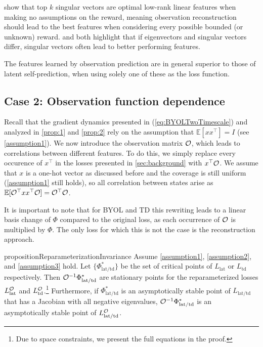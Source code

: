 \textcite{behzadian2019fast} show that top $k$ singular vectors are optimal low-rank linear features when making no assumptions on the reward, meaning observation reconstruction should lead to the best features when considering every possible bounded (or unknown) reward.
\textcite{behzadian2019fast} and \textcite{lelan2023bootstrapped} both highlight that if eigenvectors and singular vectors differ, singular vectors often lead to better performing features.

\begin{tcolorbox}[boxrule=0.2mm,colback=white,colframe=uoftblue,boxsep=0pt,top=3pt,bottom=5pt]
\begin{insight} The features learned by observation prediction are in general superior to those of latent self-prediction, when using solely one of these as the loss function.
\label{insight1}
\end{insight}
\end{tcolorbox}

\subsection{Case 2: Observation function dependence}
\label{sec:observation}

Recall that the gradient dynamics presented in (\ref{eq:BYOLTwoTimescale}) and analyzed in \autoref{prop:1} and \autoref{prop:2} rely on the assumption that $\mathbb{E}[xx^\top] = I$ (see \autoref{assumption1}).
We now introduce the observation matrix ${\mathcal{O}}$, which leads to correlations between different features.
To do this, we simply replace every occurence of $x^\top$ in the losses presented in \autoref{sec:background} with $x^\top {\mathcal{O}}$.
We assume that $x$ is a one-hot vector as discussed before and the coverage is still uniform (\autoref{assumption1} still holds), so all correlation between states arise as $\mathbb{E}[{\mathcal{O}}^\top x x^\top{\mathcal{O}}] = {\mathcal{O}}^\top {\mathcal{O}}$.

It is important to note that for BYOL and TD this rewriting leads to a linear basis change of $\Phi$ compared to the original loss, as each occurrence of ${\mathcal{O}}$ is multiplied by $\Phi$. The only loss for which this is not the case is the reconstruction approach.

\begin{restatable}{proposition}{ReparameterizationInvariance} 
Assume \autoref{assumption1}, \autoref{assumption2}, and \autoref{assumption3} hold. Let $\{\Phi^*_\mathrm{lat/td}\}$ be the set of critical points of $L_\mathrm{lat}$ or $L_\mathrm{td}$ respectively.
Then ${\mathcal{O}}^{-1}\Phi^*_\mathrm{lat/td}$ are stationary points for the reparameterized losses $L_\mathrm{lat}^{\mathcal{O}}$ and $L_\mathrm{td}^{\mathcal{O}}$.\footnote{Due to space constraints, we present the full equations in the proof.} Furthermore, if $\Phi^*_\mathrm{lat/td}$ is an asymptotically stable point of $L_\mathrm{lat/td}$ that has a Jacobian with all negative eigenvalues, ${\mathcal{O}}^{-1}\Phi^*_\mathrm{lat/td}$ is an asymptotically stable point of $L_\mathrm{lat/td}^{\mathcal{O}}$.
\end{restatable}

